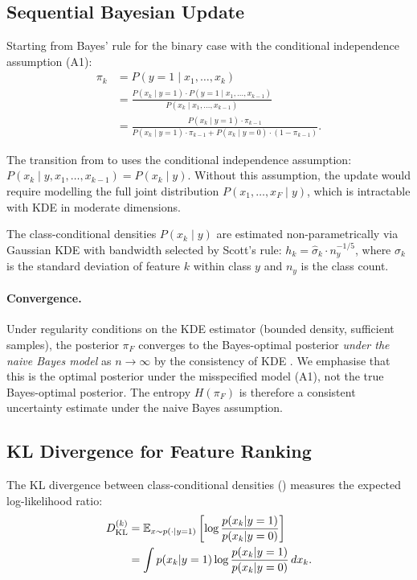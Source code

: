 \subsection{Sequential Bayesian Update}

Starting from Bayes' rule for the binary case with the conditional independence assumption (A1):
\begin{align}
\pi_k &= P(y=1 \mid x_1, \ldots, x_k) \label{eq:bayes_full_1}\\
&= \frac{P(x_k \mid y=1) \cdot P(y=1 \mid x_1, \ldots, x_{k-1})}{P(x_k \mid x_1, \ldots, x_{k-1})} \label{eq:bayes_full_2}\\
&= \frac{P(x_k \mid y=1) \cdot \pi_{k-1}}{P(x_k \mid y=1) \cdot \pi_{k-1} + P(x_k \mid y=0) \cdot (1-\pi_{k-1})}. \label{eq:bayes_full_3}
\end{align}

The transition from  to  uses the conditional independence assumption: $P(x_k \mid y, x_1, \ldots, x_{k-1}) = P(x_k \mid y)$. Without this assumption, the update would require modelling the full joint distribution $P(x_1, \ldots, x_F \mid y)$, which is intractable with KDE in moderate dimensions.

The class-conditional densities $P(x_k \mid y)$ are estimated non-parametrically via Gaussian KDE with bandwidth selected by Scott's rule: $h_k = \hat{\sigma}_k \cdot n_y^{-1/5}$, where $\hat{\sigma}_k$ is the standard deviation of feature $k$ within class $y$ and $n_y$ is the class count.

\paragraph{Convergence.} Under regularity conditions on the KDE estimator (bounded density, sufficient samples), the posterior $\pi_F$ converges to the Bayes-optimal posterior \textit{under the naive Bayes model} as $n \to \infty$ by the consistency of KDE \citep{silverman1986density}. We emphasise that this is the optimal posterior under the misspecified model (A1), not the true Bayes-optimal posterior. The entropy $H(\pi_F)$ is therefore a consistent uncertainty estimate under the naive Bayes assumption.

\subsection{KL Divergence for Feature Ranking}

The KL divergence between class-conditional densities () measures the expected log-likelihood ratio:
\begin{align}
D_{\text{KL}}^{(k)} &= \mathbb{E}_{x \sim p(\cdot | y=1)}\left[\log \frac{p(x_k | y=1)}{p(x_k | y=0)}\right] \\
&= \int p(x_k | y=1) \log \frac{p(x_k | y=1)}{p(x_k | y=0)} \, dx_k.
\end{align}

